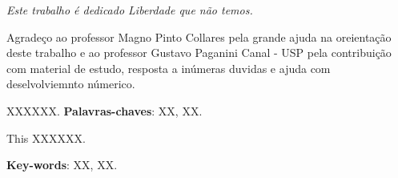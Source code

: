 \documentclass[12pt,oneside,a4paper]{abntex2}
\theoremstyle{definition}  %
\begin{document}
\imprimircapa

\imprimirfolhaderosto*

\newpage

\begin{dedicatoria}
   \vspace*{\fill}
   \centering
   \noindent
   \textit{Este trabalho é dedicado Liberdade que não temos.}
   
   \vspace{.3cm}
\end{dedicatoria}
\newpage

\begin{agradecimentos}
Agradeço ao professor Magno Pinto Collares pela grande ajuda na oreientação deste trabalho e ao professor Gustavo Paganini Canal - USP pela  contribuição com material de estudo, resposta a inúmeras duvidas e ajuda com deselvolviemnto númerico.
\end{agradecimentos}

\begin{resumo}
XXXXXX. 
\vspace{\onelineskip}
\noindent \textbf{Palavras-chaves}: XX, XX.
\newpage 
  
%
%    
\end{resumo}
\begin{resumo}[Abstract]
This XXXXXX. 
\vspace{\onelineskip}
 
 \noindent 
 \textbf{Key-words}: XX, XX.
\end{resumo}

\listoffigures*
\cleardoublepage

 \listoftables*
 \cleardoublepage

\tableofcontents*
\cleardoublepage
\mainmatter
\end{document}
